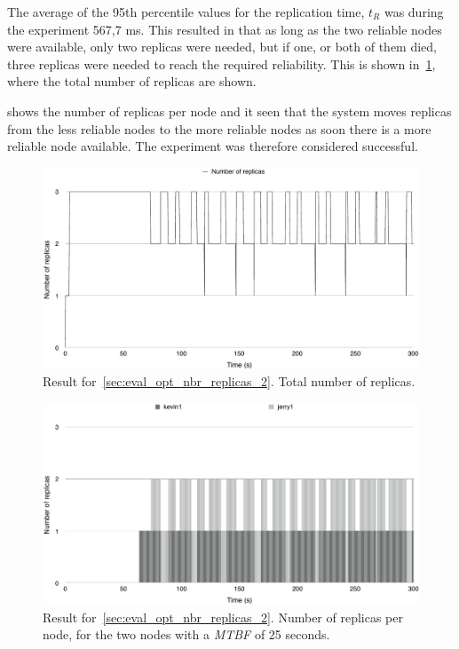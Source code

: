 \documentclass{cslthse-msc}
\begin{document}
The average of the 95th percentile values for the replication time, $t_R$ was during the experiment 567,7 ms. This resulted in that as long as the two reliable nodes were available, only two replicas were needed, but if one, or both of them died, three replicas were needed to reach the required reliability. This is shown in~\cref{fig:exp_opt_replicas_total_2}, where the total number of replicas are shown. 

 shows the number of replicas per node and it seen that the system moves replicas from the less reliable nodes to the more reliable nodes as soon there is a more reliable node available. The experiment was therefore considered successful.

\begin{figure}[!hbt]
\centering
\includegraphics[scale=0.5]{images/results/optimal_replicas/2/total.pdf}
\caption[Total number of replicas in ~\cref{sec:eval_opt_nbr_replicas_2}]{Result for~\cref{sec:eval_opt_nbr_replicas_2}. Total number of replicas.} \label{fig:exp_opt_replicas_total_2}
\end{figure}

\begin{figure}[!hbt]
\centering
\includegraphics[scale=0.5]{images/results/optimal_replicas/2/MTBF_25.pdf}
\caption[Number of replicas in ~\cref{sec:eval_opt_nbr_replicas_2} on nodes with \emph{MTBF} = 25 s]{Result for~\cref{sec:eval_opt_nbr_replicas_2}. Number of replicas per node, for the two nodes with a \emph{MTBF} of 25 seconds.} \label{fig:exp_opt_replicas_MTBF_25_2}
\end{figure}
\end{document}
